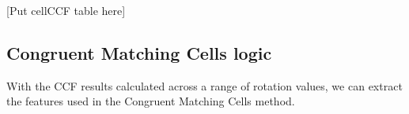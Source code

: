 
[Put cellCCF table here]

\subsection{Congruent Matching Cells logic}

With the CCF results calculated across a range of rotation values, we can extract the features used in the Congruent Matching Cells method.

